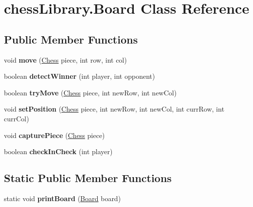 \hypertarget{classchess_library_1_1_board}{}\section{chess\+Library.\+Board Class Reference}
\label{classchess_library_1_1_board}
\subsection*{Public Member Functions}
\begin{DoxyCompactItemize}
\item 
\mbox{\label{classchess_library_1_1_board_a55ccdb873f5bfacc82ad324e5e347a29}} 
void {\bfseries move} (\hyperlink{classchess_library_1_1_chess}{Chess} piece, int row, int col)
\item 
\mbox{\label{classchess_library_1_1_board_a519a32c78465562d7c0ebe874da270ae}} 
boolean {\bfseries detect\+Winner} (int player, int opponent)
\item 
\mbox{\label{classchess_library_1_1_board_aef79046d600259559d6bfa0bc700114e}} 
boolean {\bfseries try\+Move} (\hyperlink{classchess_library_1_1_chess}{Chess} piece, int new\+Row, int new\+Col)
\item 
\mbox{\label{classchess_library_1_1_board_a7c009651ecd684c2f2cdd1a108316dae}} 
void {\bfseries set\+Position} (\hyperlink{classchess_library_1_1_chess}{Chess} piece, int new\+Row, int new\+Col, int curr\+Row, int curr\+Col)
\item 
\mbox{\label{classchess_library_1_1_board_a791dfdec4490c444e1b22245e9957754}} 
void {\bfseries capture\+Piece} (\hyperlink{classchess_library_1_1_chess}{Chess} piece)
\item 
\mbox{\label{classchess_library_1_1_board_a3b5bdbec10a75b834d69576701b50f76}} 
boolean {\bfseries check\+In\+Check} (int player)
\end{DoxyCompactItemize}
\subsection*{Static Public Member Functions}
\begin{DoxyCompactItemize}
\item 
\mbox{\label{classchess_library_1_1_board_a8046eeea7ca2301ec44efd612863aa76}} 
static void {\bfseries print\+Board} (\hyperlink{classchess_library_1_1_board}{Board} board)
\end{DoxyCompactItemize}
